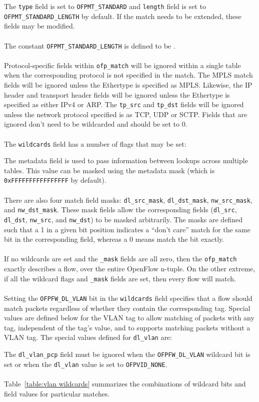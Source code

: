 
The \verb|type| field is set to \verb|OFPMT_STANDARD| and \verb|length| field is set to \verb|OFPMT_STANDARD_LENGTH| by default. If the match needs to be extended, these fields may be modified.
\\\\
The constant \verb|OFPMT_STANDARD_LENGTH| is defined to be .
\\\\
Protocol-specific fields within \verb|ofp_match| will be ignored within a single table when the corresponding protocol is not specified in the match. The MPLS match fields will be ignored unless the Ethertype is specified as MPLS. Likewise, the IP header and transport header fields will be ignored unless the Ethertype is specified as either IPv4 or ARP. The \verb|tp_src| and \verb|tp_dst| fields will be ignored unless the network protocol specified is as TCP, UDP or SCTP. Fields that are ignored don't need to be wildcarded and should be set to 0.
\\\\
The \verb|wildcards| field has a number of flags that may be set:



The metadata field is used to pass information between lookups across multiple tables. This value can be masked using the metadata mask (which is \verb|0xFFFFFFFFFFFFFFFF| by default).
\\\\
There are also four match field masks: \verb|dl_src_mask|, \verb|dl_dst_mask|, \verb|nw_src_mask|, and \verb|nw_dst_mask|. These mask fields allow the corresponding fields (\verb|dl_src|, \verb|dl_dst|, \verb|nw_src|, and \verb|nw_dst|) to be masked arbitrarily. The masks are defined such that a 1 in a given bit position indicates a ``don't care'' match for the same bit in the corresponding field, whereas a 0 means match the bit exactly.
\\\\
If no wildcards are set and the \verb|_mask| fields are all zero, then the \verb|ofp_match| exactly describes a flow, over the entire OpenFlow n-tuple.  On the other extreme, if all the wildcard flags and \verb|_mask| fields are set, then every flow will match.
\\\\
Setting the \verb|OFPFW_DL_VLAN| bit in the \verb|wildcards| field specifies that a flow should match packets regardless of whether they contain the corresponding tag. Special values are defined below for the VLAN tag to allow matching of packets with any tag, independent of the tag's value, and to supports matching packets without a VLAN tag. The special values defined for \verb|dl_vlan| are:

The \verb|dl_vlan_pcp| field must be ignored when the \verb|OFPFW_DL_VLAN| wildcard bit is set or when the \verb|dl_vlan| value is set to \verb|OFPVID_NONE|.
\\\\
Table~\ref{table:vlan wildcards} summarizes the combinations of wildcard bits and field values for particular matches.

